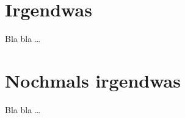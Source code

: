 
\chapter{Irgendwas}\label{sec:irgendwas}

Bla bla \dots

 \cleardoublepage


\chapter{Nochmals irgendwas}\label{sec:nochirgendwas}

Bla bla \dots

 \cleardoublepage
